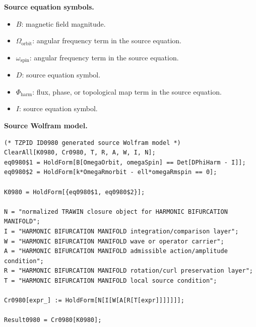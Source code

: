 \begin{minipage}[t]{0.49\linewidth}
\begingroup
\small
\raggedright
\textbf{Source equation symbols.}\par
\begin{itemize}[leftmargin=1.35em,itemsep=1pt,topsep=1pt,parsep=0pt]
    \item $B$: magnetic field magnitude.
    \item $\Omega_{\mathrm{orbit}}$: angular frequency term in the source equation.
    \item $\omega_{\mathrm{spin}}$: angular frequency term in the source equation.
    \item $D$: source equation symbol.
    \item $\Phi_{\mathrm{harm}}$: flux, phase, or topological map term in the source equation.
    \item $I$: source equation symbol.
\end{itemize}
\endgroup
\end{minipage}\hfill
\begin{minipage}[t]{0.47\linewidth}
\begingroup
\scriptsize
\raggedright
\textbf{Source Wolfram model.}\par
\begin{Verbatim}[fontsize=\tiny,breaklines=true,breakanywhere=true]
(* TZPID ID0980 generated source Wolfram model *)
ClearAll[K0980, Cr0980, T, R, A, W, I, N];
eq0980$1 = HoldForm[B[OmegaOrbit, omegaSpin] == Det[DPhiHarm - I]];
eq0980$2 = HoldForm[k*OmegaRmorbit - ell*omegaRmspin == 0];

K0980 = HoldForm[{eq0980$1, eq0980$2}];

N = "normalized TRAWIN closure object for HARMONIC BIFURCATION MANIFOLD";
I = "HARMONIC BIFURCATION MANIFOLD integration/comparison layer";
W = "HARMONIC BIFURCATION MANIFOLD wave or operator carrier";
A = "HARMONIC BIFURCATION MANIFOLD admissible action/amplitude condition";
R = "HARMONIC BIFURCATION MANIFOLD rotation/curl preservation layer";
T = "HARMONIC BIFURCATION MANIFOLD local source condition";

Cr0980[expr_] := HoldForm[N[I[W[A[R[T[expr]]]]]]];

Result0980 = Cr0980[K0980];
\end{Verbatim}
\endgroup
\end{minipage}

